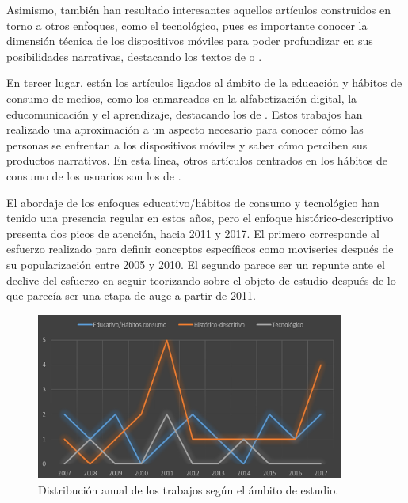 \documentclass[spanish]{textolivre}
\begin{document}
Asimismo, también han resultado interesantes aquellos artículos construidos en torno a otros enfoques, como el tecnológico, pues es importante conocer la dimensión técnica de los dispositivos móviles para poder profundizar en sus posibilidades narrativas, destacando los textos de \textcite{tamayofernandez2011, chuchu2014, jumiskopyykko2008} o \textcite{evens2011}.

En tercer lugar, están los artículos ligados al ámbito de la educación y hábitos de consumo de medios, como los enmarcados en la alfabetización digital, la educomunicación y el aprendizaje, destacando los de \textcite{phillippi-miranda2011, gomez2007, tornero2019, su2015, galindo2015}. Estos trabajos han realizado una aproximación a un aspecto necesario para conocer cómo las personas se enfrentan a los dispositivos móviles y saber cómo perciben sus productos narrativos. En esta línea, otros artículos centrados en los hábitos de consumo de los usuarios son los de \textcite{shim2017, figeac2009, do2009, goggin2012, urban2007}. 

El abordaje de los enfoques educativo/hábitos de consumo y tecnológico han tenido una presencia regular en estos años, pero el enfoque histórico-descriptivo presenta dos picos de atención, hacia 2011 y 2017. El primero corresponde al esfuerzo realizado para definir conceptos específicos como moviseries \cite{adelantadomateu2011, morante2011, saez2010} después de su popularización entre 2005 y 2010. El segundo parece ser un repunte ante el declive del esfuerzo en seguir teorizando sobre el objeto de estudio después de lo que parecía ser una etapa de auge a partir de 2011. 

\begin{figure}[htbp]
 \centering
 \includegraphics[width=0.9\textwidth]{fig-001[1].jpg}
 \caption{Distribución anual de los trabajos según el ámbito de estudio.}
 \label{fig1}
\end{figure}
\end{document}
